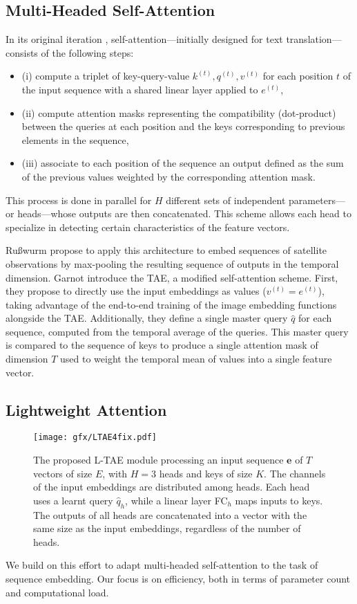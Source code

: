 \documentclass[runningheads]{llncs}
\begin{document}
\subsection{Multi-Headed Self-Attention}
\label{sec:selfattention}
In its original iteration \cite{vaswani2017attention}, self-attention---initially designed for text translation---consists of the following steps:
\begin{itemize}
    \item[](i) compute a triplet of key-query-value $k^{(t)}, q^{(t)}, v^{(t)}$ for each position $t$ of the input sequence with a shared linear layer applied to $e^{(t)}$,
    \item[](ii) compute attention masks representing the compatibility (dot-product) between the queries at each position and the keys corresponding to previous elements in the sequence,
    \item[](iii) associate to each position of the sequence an output defined as the sum of the previous values weighted by the corresponding attention mask. 
\end{itemize}
This process is done in parallel for $H$ different sets of independent parameters---or heads---whose outputs are then concatenated. This scheme allows each head to specialize in detecting certain characteristics of the feature vectors.

Ru{\ss}wurm \etal \cite{russwurm2019self} propose to apply this architecture to embed sequences of satellite observations by max-pooling the resulting sequence of outputs in the temporal dimension.
Garnot \etal \cite{garnot2019satellite} introduce the TAE, a modified self-attention scheme. First, they propose to directly use the input embeddings as values ($v^{(t)} = e^{(t)}$), taking advantage of the end-to-end training of the image embedding functions alongside the TAE. Additionally, they define a single master query $\hat{q}$ for each sequence, computed from the temporal average of the queries. This master query is compared to the sequence of keys to produce a single attention mask of dimension $T$ used to weight the temporal mean of values into a single feature vector. 
\subsection{Lightweight Attention}
\begin{figure}[t]
    \centering
    \texttt{[image: gfx/LTAE4fix.pdf]}
    \caption{The proposed L-TAE module processing an input sequence $\mathbf{e}$ of $T$ vectors of size $E$, with $H=3$ heads and keys of size $K$.
    The channels of the input embeddings are distributed among heads. Each head uses a learnt query $\hat{q}_h$, while a linear layer FC$_h$ maps inputs to keys. The outputs of all heads are concatenated into a vector with the same size as the input embeddings, regardless of the number of heads. }
    \label{fig:pipeline}
\end{figure}
We build on this effort to adapt multi-headed self-attention to the task of sequence embedding. Our focus is on efficiency, both in terms of parameter count and computational load. 
\end{document}
